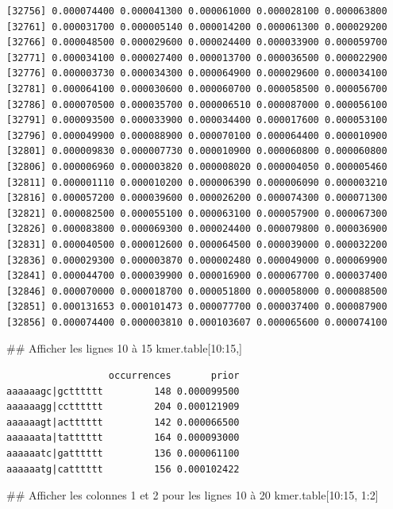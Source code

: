 \documentclass[]{article}
\newenvironment{Shaded}{\begin{snugshade}}{\end{snugshade}}
\newcommand{\DecValTok}[1]{\textcolor[rgb]{0.86,0.86,0.80}{#1}}
\newcommand{\OperatorTok}[1]{\textcolor[rgb]{0.94,0.94,0.82}{#1}}
\newcommand{\NormalTok}[1]{\textcolor[rgb]{0.80,0.80,0.80}{#1}}
\begin{document}
\begin{verbatim}
[32756] 0.000074400 0.000041300 0.000061000 0.000028100 0.000063800
[32761] 0.000031700 0.000005140 0.000014200 0.000061300 0.000029200
[32766] 0.000048500 0.000029600 0.000024400 0.000033900 0.000059700
[32771] 0.000034100 0.000027400 0.000013700 0.000036500 0.000022900
[32776] 0.000003730 0.000034300 0.000064900 0.000029600 0.000034100
[32781] 0.000064100 0.000030600 0.000060700 0.000058500 0.000056700
[32786] 0.000070500 0.000035700 0.000006510 0.000087000 0.000056100
[32791] 0.000093500 0.000033900 0.000034400 0.000017600 0.000053100
[32796] 0.000049900 0.000088900 0.000070100 0.000064400 0.000010900
[32801] 0.000009830 0.000007730 0.000010900 0.000060800 0.000060800
[32806] 0.000006960 0.000003820 0.000008020 0.000004050 0.000005460
[32811] 0.000001110 0.000010200 0.000006390 0.000006090 0.000003210
[32816] 0.000057200 0.000039600 0.000026200 0.000074300 0.000071300
[32821] 0.000082500 0.000055100 0.000063100 0.000057900 0.000067300
[32826] 0.000083800 0.000069300 0.000024400 0.000079800 0.000036900
[32831] 0.000040500 0.000012600 0.000064500 0.000039000 0.000032200
[32836] 0.000029300 0.000003870 0.000002480 0.000049000 0.000069900
[32841] 0.000044700 0.000039900 0.000016900 0.000067700 0.000037400
[32846] 0.000070000 0.000018700 0.000051800 0.000058000 0.000088500
[32851] 0.000131653 0.000101473 0.000077700 0.000037400 0.000087900
[32856] 0.000074400 0.000003810 0.000103607 0.000065600 0.000074100
\end{verbatim}

\begin{Shaded}
\begin{Highlighting}[]
\NormalTok{## Afficher les lignes 10 à 15}
\NormalTok{kmer.table[}\DecValTok{10}\OperatorTok{:}\DecValTok{15}\NormalTok{,] }
\end{Highlighting}
\end{Shaded}

\begin{verbatim}
                  occurrences       prior
aaaaaagc|gctttttt         148 0.000099500
aaaaaagg|cctttttt         204 0.000121909
aaaaaagt|actttttt         142 0.000066500
aaaaaata|tatttttt         164 0.000093000
aaaaaatc|gatttttt         136 0.000061100
aaaaaatg|catttttt         156 0.000102422
\end{verbatim}

\begin{Shaded}
\begin{Highlighting}[]
\NormalTok{## Afficher les colonnes 1 et 2 pour les lignes 10 à 20}
\NormalTok{kmer.table[}\DecValTok{10}\OperatorTok{:}\DecValTok{15}\NormalTok{, }\DecValTok{1}\OperatorTok{:}\DecValTok{2}\NormalTok{] }
\end{Highlighting}
\end{Shaded}
\end{document}
